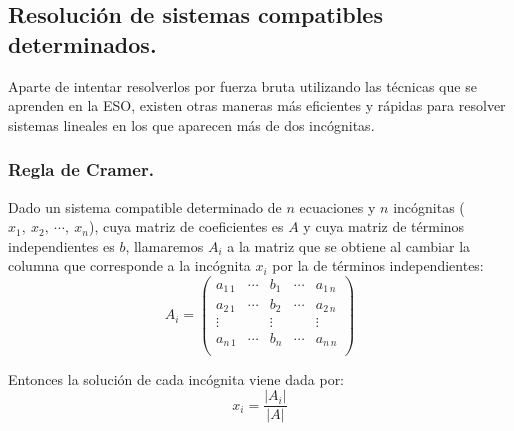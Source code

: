 \documentclass[a4paper,11pt,answers]{exam}
\begin{document}
\subsection{Resolución de sistemas compatibles determinados.}
Aparte de intentar resolverlos por fuerza bruta utilizando las técnicas que se aprenden en la ESO, existen otras maneras más eficientes y rápidas para resolver sistemas lineales en los que aparecen más de dos incógnitas.
\subsubsection{Regla de Cramer.}
Dado un sistema compatible determinado de $n$ ecuaciones y $n$ incógnitas ($x_1,\ x_2,\ \cdots,\ x_n$), cuya matriz de coeficientes es $A$ y cuya matriz de términos independientes es $b$, llamaremos $A_i$ a la matriz que se obtiene al cambiar la columna que corresponde a la incógnita $x_i$ por la de términos independientes:
\[A_i = \left(\begin{array}{rrrrr}
	a_{1\,1}&\cdots&b_1&\cdots&a_{1\,n}\\
	a_{2\,1}&\cdots&b_2&\cdots&a_{2\,n}\\
	\vdots&&\vdots&&\vdots\\
	a_{n\,1}&\cdots&b_n&\cdots&a_{n\,n}\\
\end{array}\right)\]

Entonces la solución de cada incógnita viene dada por:
\[x_i = \frac{|A_i|}{|A|}\]
\end{document}
